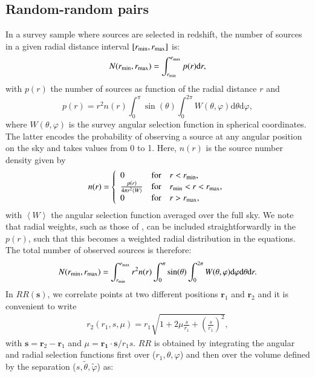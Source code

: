 \documentclass{aa}
\newcommand{\ev}[1]{\left\langle #1 \right\rangle}
\newcommand{\dd}{\mathrm{d}}
\begin{document}
\subsection{Random-random pairs}
\label{sec:RR_pairs}
In a survey sample where sources are selected in redshift, 
the number of sources in a given radial distance interval $[r_{\rm min}, r_{\rm max}]$ is:
%
\begin{equation}
    N(r_{\rm min}, r_{\rm max}) = \int_{r_{\rm min}}^{r_{\rm max}}p(r)\dd r,
    \label{eq:Nr}
\end{equation}
%
with $p(r)$ the number of sources as function of the radial distance $r$ and
%
\begin{equation}
   p(r) = r^2 n(r)\int_0^\pi \sin(\theta)\int_0^{2\pi}W(\theta, \varphi)\dd\theta\dd\varphi,
\end{equation}
%
where $W(\theta, \varphi)$ is the survey angular selection function in spherical coordinates. The latter encodes the probability of observing a source at any angular position on the sky and takes values from 0 to 1. Here, $n(r)$ is the source number density given by
%
\begin{equation}
n(r) = 
\left\lbrace
\begin{array}{lcl}
0  &  \rm{for} & r < r_{\rm min},  \\
\frac{p(r)}{4\pi r^2\ev{W}} & \rm{for} & r_{\rm min} < r < r_{\rm max}, \\
0  & \rm{for} & r > r_{\rm max},
\end{array}\right.
\label{eq:ntilde}
\end{equation}
%
with $\ev{W}$ the angular selection function averaged over the full sky. We note that radial weights, such as those of \citealt{feldman1994power}, can be included straightforwardly in the $p(r)$, such that this becomes a weighted radial distribution in the equations. The total number of observed sources is therefore: 
%
\begin{multline}
N(r_{\rm min}, r_{\rm max}) = \int_{r_{\rm min}}^{r_{\rm max}}r^2 n(r)\int_{0}^{\pi}\sin(\theta)\int_{0}^{2\pi}W(\theta, \varphi)\dd\varphi\dd\theta\dd r .
\end{multline}
%
In $RR(\bm{s})$, we correlate points at two different positions $\bm{r}_1$ and $\bm{r}_2$ and it is convenient to write
%
\begin{eqnarray}
  r_2(r_1, s, \mu) = r_1\sqrt{1+2\mu \frac{s}{r_1} + \left(\frac{s}{r_1}\right)^2},    
\end{eqnarray}
%
with $\bm{s} = \bm{r}_2 - \bm{r}_1$ and $\mu = \bm{r_1}\cdot\bm{s}/r_1s$. $RR$ is obtained by integrating the angular and radial selection functions first over ($r_1, \theta, \varphi$) and then over the volume defined by the separation ($s, \tilde{\theta}, \tilde{\varphi}$) as:
\end{document}
